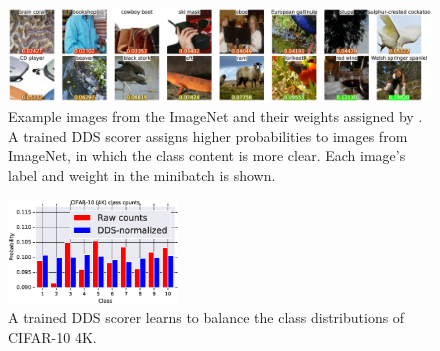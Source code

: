 \begin{figure}
    \includegraphics[width=\textwidth]{figs/imagenet_dds.eps}
  \caption{\label{fig:dds_score} Example images from the ImageNet and their weights assigned by \dds. A trained DDS scorer assigns higher probabilities to images from ImageNet, in which the class content is more clear. Each image's label and weight in the minibatch is shown.}
\end{figure}

\begin{figure}
  \centering
    \includegraphics[width=0.4\textwidth]{figs/cifar10_dds.eps}
  \caption{\label{fig:dds_distribution}A trained DDS scorer learns to balance the class distributions of CIFAR-10 4K.}
\end{figure}


